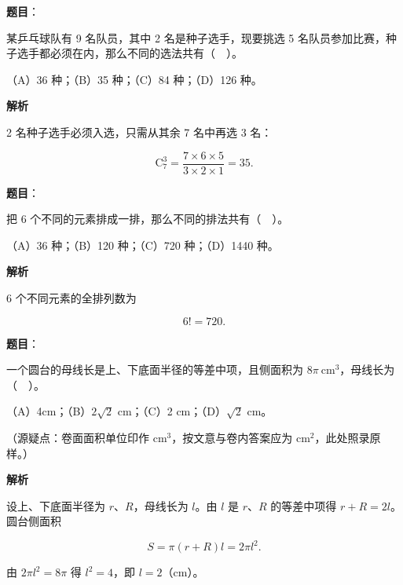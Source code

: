 \begin{answer}

\textbf{题目}：

某乒乓球队有 9 名队员，其中 2 名是种子选手，现要挑选 5 名队员参加比赛，种子选手都必须在内，那么不同的选法共有（　）。

（A）36 种；（B）35 种；（C）84 种；（D）126 种。

\textbf{解析}

2 名种子选手必须入选，只需从其余 7 名中再选 3 名：

\nopagebreak[4]
\[
\mathrm{C}_7^3=\frac{7\times6\times5}{3\times2\times1}=35.
\]


\end{answer}
\begin{answer}

\textbf{题目}：

把 6 个不同的元素排成一排，那么不同的排法共有（　）。

（A）36 种；（B）120 种；（C）720 种；（D）1440 种。

\textbf{解析}

6 个不同元素的全排列数为

\nopagebreak[4]
\[
6!=720.
\]


\end{answer}
\begin{answer}

\textbf{题目}：

一个圆台的母线长是上、下底面半径的等差中项，且侧面积为 $8\pi\ \mathrm{cm}^3$，母线长为（　）。

（A）4cm；（B）$2\sqrt2$ cm；（C）2 cm；（D）$\sqrt2$ cm。

（源疑点：卷面面积单位印作 $\mathrm{cm}^3$，按文意与卷内答案应为 $\mathrm{cm}^2$，此处照录原样。）

\textbf{解析}

设上、下底面半径为 $r$、$R$，母线长为 $l$。由 $l$ 是 $r$、$R$ 的等差中项得 $r+R=2l$。圆台侧面积

\nopagebreak[4]
\[
S=\pi(r+R)l=2\pi l^2.
\]

由 $2\pi l^2=8\pi$ 得 $l^2=4$，即 $l=2$（$\mathrm{cm}$）。


\end{answer}
